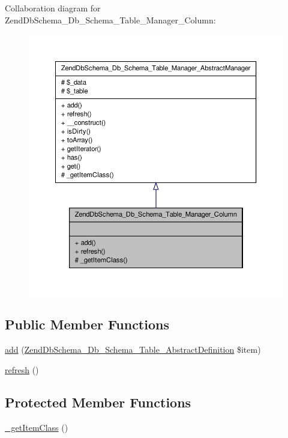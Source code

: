 \-Collaboration diagram for \-Zend\-Db\-Schema\-\_\-\-Db\-\_\-\-Schema\-\_\-\-Table\-\_\-\-Manager\-\_\-\-Column\-:\nopagebreak
\begin{figure}[H]
\begin{center}
\leavevmode
\includegraphics[width=350pt]{classZendDbSchema__Db__Schema__Table__Manager__Column__coll__graph}
\end{center}
\end{figure}
\subsection*{\-Public \-Member \-Functions}
\begin{DoxyCompactItemize}
\item 
\hyperlink{classZendDbSchema__Db__Schema__Table__Manager__Column_a1265f7c88df7401761b8e5dde4e94da1}{add} (\hyperlink{classZendDbSchema__Db__Schema__Table__AbstractDefinition}{\-Zend\-Db\-Schema\-\_\-\-Db\-\_\-\-Schema\-\_\-\-Table\-\_\-\-Abstract\-Definition} \$item)
\item 
\hyperlink{classZendDbSchema__Db__Schema__Table__Manager__Column_a2fe390d7ee88040f30bb31329d4ed5b9}{refresh} ()
\end{DoxyCompactItemize}
\subsection*{\-Protected \-Member \-Functions}
\begin{DoxyCompactItemize}
\item 
\hyperlink{classZendDbSchema__Db__Schema__Table__Manager__Column_a37d284cbaad16050989650cd4c1c6bbe}{\-\_\-get\-Item\-Class} ()
\end{DoxyCompactItemize}


